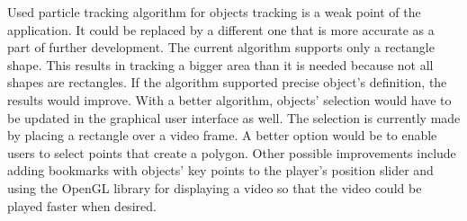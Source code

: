 Used particle tracking algorithm for objects tracking is a weak point of the application. It could be replaced by a different one that is more accurate as a part of further development. The current algorithm supports only a rectangle shape. This results in tracking a bigger area than it is needed because not all shapes are rectangles. If the algorithm supported precise object's definition, the results would improve. With a better algorithm, objects' selection would have to be updated in the graphical user interface as well. The selection is currently made by placing a rectangle over a video frame. A better option would be to enable users to select points that create a polygon. Other possible improvements include adding bookmarks with objects' key points to the player's position slider and using the OpenGL library for displaying a video so that the video could be played faster when desired. 

